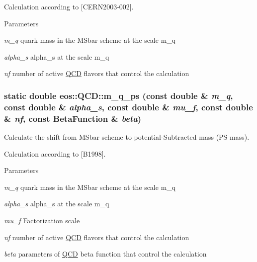 Calculation according to \mbox{[}CERN2003-\/002\mbox{]}.


\begin{DoxyParams}{Parameters}
\item[{\em m\_\-q}]quark mass in the MSbar scheme at the scale m\_\-q \item[{\em alpha\_\-s}]alpha\_\-s at the scale m\_\-q \item[{\em nf}]number of active \hyperlink{classeos_1_1QCD}{QCD} flavors that control the calculation \end{DoxyParams}
\hypertarget{classeos_1_1QCD_a09637e36c232414e489bf75faa359e5d}{
\subsubsection[{m\_\-q\_\-ps}]{\setlength{\rightskip}{0pt plus 5cm}static double eos::QCD::m\_\-q\_\-ps (const double \& {\em m\_\-q}, \/  const double \& {\em alpha\_\-s}, \/  const double \& {\em mu\_\-f}, \/  const double \& {\em nf}, \/  const {\bf BetaFunction} \& {\em beta})}}
\label{classeos_1_1QCD_a09637e36c232414e489bf75faa359e5d}
Calculate the shift from MSbar scheme to potential-\/Subtracted mass (PS mass).

Calculation according to \mbox{[}B1998\mbox{]}.


\begin{DoxyParams}{Parameters}
\item[{\em m\_\-q}]quark mass in the MSbar scheme at the scale m\_\-q \item[{\em alpha\_\-s}]alpha\_\-s at the scale m\_\-q \item[{\em mu\_\-f}]Factorization scale \item[{\em nf}]number of active \hyperlink{classeos_1_1QCD}{QCD} flavors that control the calculation \item[{\em beta}]parameters of \hyperlink{classeos_1_1QCD}{QCD} beta function that control the calculation \end{DoxyParams}


